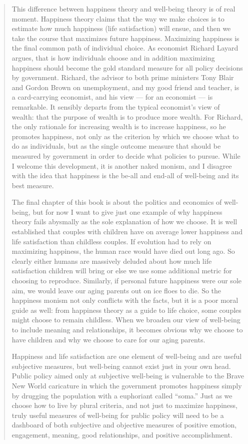 \documentclass[]{book}
\begin{document}
\begin{quote}
This difference between happiness theory and well-being theory is of real moment. Happiness theory claims that the way we make choices is to estimate how much happiness (life satisfaction) will ensue, and then we take the course that maximizes future happiness. Maximizing happiness is the final common path of individual choice. As economist Richard Layard argues, that is how individuals choose and in addition maximizing happiness should become the gold standard measure for all policy decisions by government. Richard, the advisor to both prime ministers Tony Blair and Gordon Brown on unemployment, and my good friend and teacher, is a card-carrying economist, and his view --- for an economist --- is remarkable. It sensibly departs from the typical economist's view of wealth: that the purpose of wealth is to produce more wealth. For Richard, the only rationale for increasing wealth is to increase happiness, so he promotes happiness, not only as the criterion by which we choose what to do as individuals, but as the single outcome measure that should be measured by government in order to decide what policies to pursue. While I welcome this development, it is another naked monism, and I disagree with the idea that happiness is the be-all and end-all of well-being and its best measure.

The final chapter of this book is about the politics and economics of well-being, but for now I want to give just one example of why happiness theory fails abysmally as the sole explanation of how we choose. It is well established that couples with children have on average lower happiness and life satisfaction than childless couples. If evolution had to rely on maximizing happiness, the human race would have died out long ago. So clearly either humans are massively deluded about how much life satisfaction children will bring or else we use some additional metric for choosing to reproduce. Similarly, if personal future happiness were our sole aim, we would leave our aging parents out on ice floes to die. So the happiness monism not only conflicts with the facts, but it is a poor moral guide as well: from happiness theory as a guide to life choice, some couples might choose to remain childless. When we broaden our view of well-being to include meaning and relationships, it becomes obvious why we choose to have children and why we choose to care for our aging parents.

Happiness and life satisfaction are one element of well-being and are useful subjective measures, but well-being cannot exist just in your own head. Public policy aimed only at subjective well-being is vulnerable to the Brave New World caricature in which the government promotes happiness simply by drugging the population with a euphoriant called ``soma.'' Just as we choose how to live by plural criteria, and not just to maximize happiness, truly useful measures of well-being for public policy will need to be a dashboard of both subjective and objective measures of positive emotion, engagement, meaning, good relationships, and positive accomplishment.
\end{quote}
\end{document}
